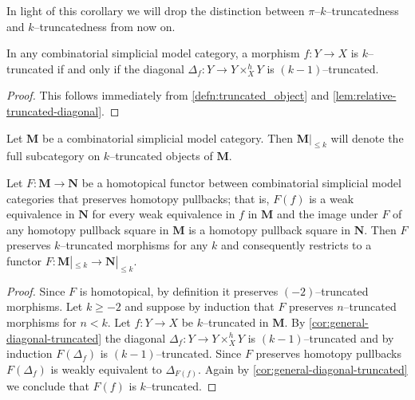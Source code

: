 In light of this corollary we will drop the distinction between \(\pi\)--\(k\)--truncatedness and \(k\)--truncated\-ness from now on.

\begin{corollary}\label{cor:general-diagonal-truncated}
  In any combinatorial simplicial model category, a morphism \(f\colon Y\to X\) is \(k\)--truncated if and only if the diagonal \(\Delta_{f}\colon Y\to Y\times^{h}_{X} Y\) is \((k-1)\)--truncated.
\end{corollary}
\begin{proof}
  This follows immediately from \autoref{defn:truncated_object} and \autoref{lem:relative-truncated-diagonal}.
\end{proof}

\begin{definition}
  Let \(\mathbf{M}\) be a combinatorial simplicial model category. Then \(\mathbf{M}|_{{\leq}k}\) will denote the full subcategory on \(k\)--truncated objects of \(\mathbf{M}\).
\end{definition}

\begin{proposition}\label{prop:truncated-objects-exact-functors}
  Let \(F\colon \mathbf{M}\to\mathbf{N}\) be a homotopical functor between combinatorial simplicial model categories that preserves homotopy pullbacks; that is, \(F(f)\) is a weak equivalence in \(\mathbf N\) for every weak equivalence in \(f\) in \(\mathbf M\) and the image under \(F\) of any homotopy pullback square in \(\mathbf M\) is a homotopy pullback square in \(\mathbf N\). Then \(F\) preserves \(k\)--truncated morphisms for any \(k\) and consequently restricts to a functor \(F\colon \mathbf M|_{\leq k}\to\mathbf N|_{\leq k}\).
\end{proposition}
\begin{proof}
  Since \(F\) is homotopical, by definition it preserves \((-2)\)--truncated morphisms. Let \(k\geq -2\) and suppose by induction that \(F\) preserves \(n\)--truncated morphisms for \(n<k\). Let \(f\colon Y\to X\) be \(k\)--truncated in \(\mathbf M\). By \autoref{cor:general-diagonal-truncated} the diagonal \(\Delta_{f}\colon Y\to Y\times^{h}_{X} Y\) is \((k-1)\)--truncated and by induction \(F(\Delta_{f})\) is \((k-1)\)--truncated. Since \(F\) preserves homotopy pullbacks \(F(\Delta_{f})\) is weakly equivalent to \(\Delta_{F(f)}\). Again by \autoref{cor:general-diagonal-truncated} we conclude that \(F(f)\) is \(k\)--truncated.
\end{proof}


